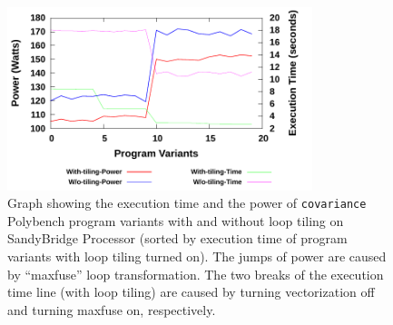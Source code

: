%
%

\begin{figure}[bt]
    \includegraphics[width=3.5in]{Covariance}
    \caption{Graph showing the execution time and the power of \texttt{covariance} Polybench program variants with 
and without loop tiling on SandyBridge Processor (sorted by execution time of program variants with loop tiling turned on).
 The jumps of power are caused by ``maxfuse'' loop transformation. The two breaks of the execution time line (with loop tiling)
are caused by turning vectorization off and turning maxfuse on, respectively.}
    \label{fig:TE}
\end{figure}
